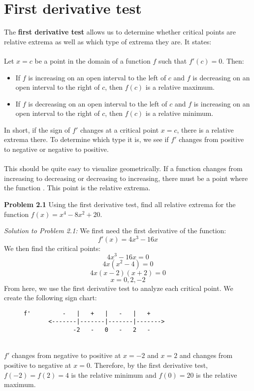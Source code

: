 \documentclass[11pt]{scrartcl}
\begin{document}
\section{First derivative test}
\noindent 
The \textbf{first derivative test} allows us to determine whether critical points are relative extrema as well as which type of extrema they are. It states: \\
\\
\noindent 
Let $x=c$ be a point in the domain of a function $f$ such that $f'(c)=0$. Then: 
\begin{itemize}
    \item If $f$ is increasing on an open interval to the left of $c$ and $f$ is decreasing on an open interval to the right of $c$, then $f(c)$ is a relative maximum. 
    \item If $f$ is decreasing on an open interval to the left of $c$ and $f$ is increasing on an open interval to the right of $c$, then $f(c)$ is a relative minimum. 
\end{itemize}
\noindent 
In short, if the sign of $f'$ changes at a critical point $x=c$, there is a relative extrema there. To determine which type it is, we see if $f'$ changes from positive to negative or negative to positive. \\
\\
\noindent 
This should be quite easy to visualize geometrically. If a function changes from increasing to decreasing or decreasing to increasing, there must be a point where the function . This point is the relative extrema. 
\begin{tcolorbox}
[colback=purple!5!white,colframe=purple!75!black]
\textbf{Problem 2.1} Using the first derivative test, find all relative extrema for the function $f(x)=x^4-8x^2+20$. 
\end{tcolorbox}
\noindent 
\textit{Solution to Problem 2.1:} We first need the first derivative of the function: 
$$f'(x)=4x^3-16x$$
\noindent 
We then find the critical points: 
$$4x^3-16x=0$$
$$4x(x^2-4)=0$$
$$4x(x-2)(x+2)=0$$
$$x=0,2,-2$$
\noindent 
From here, we use the first derivative test to analyze each critical point. We create the following sign chart: 
\begin{figure} [htp]
\centering
\begin{BVerbatim}
f'         -   |   +   |   -   |   +   
       <-------|-------|-------|------->
              -2   -   0   -   2   -     
\end{BVerbatim}
\end{figure}
\\
\noindent 
$f'$ changes from negative to positive at $x=-2$ and $x=2$ and changes from positive to negative at $x=0$. Therefore, by the first derivative test, $f(-2)=f(2)=4$ is the relative minimum and $f(0)=20$ is the relative maximum.
\end{document}

